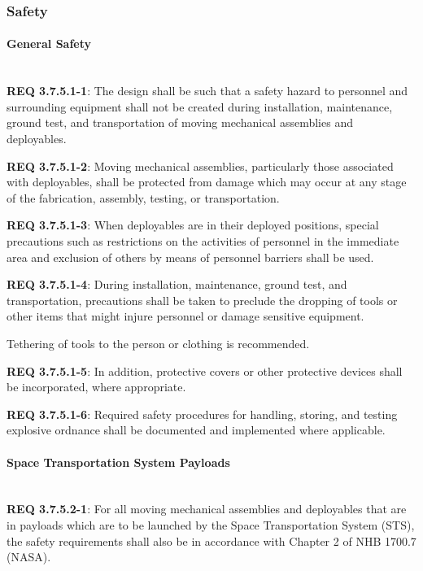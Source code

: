 \documentclass[12pt]{article}
\begin{document}
\subsubsection{Safety} %
\paragraph{General Safety} \mbox{} \\ %
\noindent \textbf{REQ 3.7.5.1-1}: The design shall be such that a safety hazard to personnel and surrounding equipment shall not be created during installation, maintenance, ground test, and transportation of moving mechanical assemblies and deployables.

\noindent \textbf{REQ 3.7.5.1-2}: Moving mechanical assemblies, particularly those associated with deployables, shall be protected from damage which may occur at any stage of the fabrication, assembly, testing, or transportation. 

\noindent \textbf{REQ 3.7.5.1-3}: When deployables are in their deployed positions, special precautions such as restrictions on the activities of personnel in the immediate area and exclusion of others by means of personnel barriers shall be used. 

\noindent \textbf{REQ 3.7.5.1-4}: During installation, maintenance, ground test, and transportation, precautions shall be taken to preclude the dropping of tools or other items that might injure personnel or damage sensitive equipment. 

Tethering of tools to the person or clothing is recommended. 

\noindent \textbf{REQ 3.7.5.1-5}: In addition, protective covers or other protective devices shall be incorporated, where appropriate. 

\noindent \textbf{REQ 3.7.5.1-6}: Required safety procedures for handling, storing, and testing explosive ordnance shall be documented and implemented where applicable.


\paragraph{Space Transportation System Payloads} \mbox{} \\ %
\noindent \textbf{REQ 3.7.5.2-1}: For all moving mechanical assemblies and deployables that are in payloads which are to be launched by the Space Transportation System (STS), the safety requirements shall also be in accordance with Chapter 2 of NHB 1700.7 (NASA). 
\end{document}
